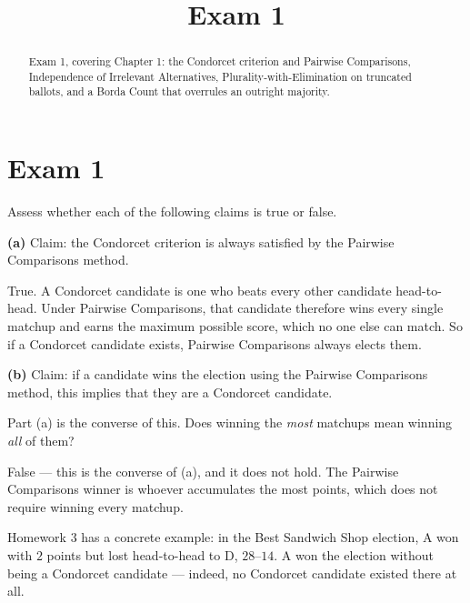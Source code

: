 \documentclass[12pt]{ximera}
\title{Exam 1}
\begin{document}
\begin{abstract}
Exam 1, covering Chapter 1: the Condorcet criterion and Pairwise Comparisons,
Independence of Irrelevant Alternatives, Plurality-with-Elimination on truncated
ballots, and a Borda Count that overrules an outright majority.
\end{abstract}
\maketitle

\section*{Exam 1}

\begin{problem}
Assess whether each of the following claims is true or false.

\begin{prompt}
\textbf{(a)} Claim: the Condorcet criterion is always satisfied by the Pairwise
Comparisons method.

\begin{multipleChoice}
\end{multipleChoice}

\begin{feedback}
True. A Condorcet candidate is one who beats every other candidate head-to-head. Under
Pairwise Comparisons, that candidate therefore wins every single matchup and earns the
maximum possible score, which no one else can match. So if a Condorcet candidate
exists, Pairwise Comparisons always elects them.
\end{feedback}
\end{prompt}

\begin{prompt}
\textbf{(b)} Claim: if a candidate wins the election using the Pairwise Comparisons
method, this implies that they are a Condorcet candidate.

\begin{multipleChoice}
\end{multipleChoice}

\begin{hint}
Part (a) is the converse of this. Does winning the \emph{most} matchups mean winning
\emph{all} of them?
\end{hint}

\begin{feedback}
False --- this is the converse of (a), and it does not hold. The Pairwise Comparisons
winner is whoever accumulates the most points, which does not require winning every
matchup.

Homework 3 has a concrete example: in the Best Sandwich Shop election, A won with $2$
points but lost head-to-head to D, $28$--$14$. A won the election without being a
Condorcet candidate --- indeed, no Condorcet candidate existed there at all.
\end{feedback}
\end{prompt}
\end{problem}
\end{document}
